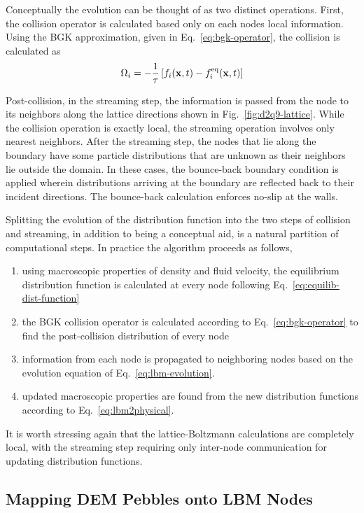 Conceptually the evolution can be thought of as two distinct operations. First, the collision operator is calculated based only on each nodes local information. Using the BGK approximation, given in Eq.~\ref{eq:bgk-operator}, the collision is calculated as
\begin{align}
	\Omega_i = -\frac{1}{\tau}\left[f_i(\mathbf{x},t) - f_i^{\text{eq}}(\mathbf{x},t)\right]
\end{align}

Post-collision, in the streaming step, the information is passed from the node to its neighbors along the lattice directions shown in Fig.~\ref{fig:d2q9-lattice}. While the collision operation is exactly local, the streaming operation involves only nearest neighbors. After the streaming step, the nodes that lie along the boundary have some particle distributions that are unknown as their neighbors lie outside the domain. In these cases, the bounce-back boundary condition is applied wherein distributions arriving at the boundary are reflected back to their incident directions. The bounce-back calculation enforces no-slip at the walls.

Splitting the evolution of the distribution function into the two steps of collision and streaming, in addition to being a conceptual aid, is a natural partition of computational steps. In practice the algorithm proceeds as follows,\cite{Viggen2009}
\begin{enumerate}
	\item{using macroscopic properties of density and fluid velocity, the equilibrium distribution function is calculated at every node following Eq.~\ref{eq:equilib-dist-function}}
	\item{the BGK collision operator is calculated according to Eq.~\ref{eq:bgk-operator} to find the post-collision distribution of every node}
	\item{information from each node is propagated to neighboring nodes based on the evolution equation of Eq.~\ref{eq:lbm-evolution}.}
	\item{updated macroscopic properties are found from the new distribution functions according to Eq.~\ref{eq:lbm2physical}.}
\end{enumerate}

It is worth stressing again that the lattice-Boltzmann calculations are completely local, with the streaming step requiring only inter-node communication for updating distribution functions. 




\subsection{Mapping DEM Pebbles onto LBM Nodes}

